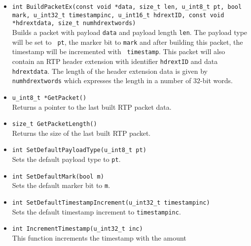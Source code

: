 \documentclass[12pt,a4paper]{article}
\begin{document}
\begin{itemize}
{					                             u\_int16\_t hdrextID, const void *hdrextdata, size\_t numhdrextwords)}\\
						Builds a packet with payload {\tt data} and payload length
						{\tt len}. The payload type, marker and timestamp increment
						used will be those that have been set using the 
						{\tt SetDefault} functions below. This packet will also contain
						an RTP header extension with identifier {\tt hdrextID} and data
						{\tt hdrextdata}. The length of the header extension data
						is given by {\tt numhdrextwords} which expresses the length
						in a number of $32$-bit words.
					\item {\tt int BuildPacketEx(const void *data, size\_t len,
					                             u\_int8\_t pt, bool mark, u\_int32\_t timestampinc,
					                             u\_int16\_t hdrextID, const void *hdrextdata, size\_t numhdrextwords)}\\
						Builds a packet with payload {\tt data} and payload
						length {\tt len}. The payload type will be set to {\tt
						pt}, the marker bit to {\tt mark} and after building
						this packet, the timestamp will be incremented with {\tt
						timestamp}. This packet will also contain an RTP header
						extension with identifier {\tt hdrextID} and data {\tt
						hdrextdata}. The length of the header extension data is
						given by {\tt numhdrextwords} which expresses the length
						in a number of $32$-bit words.
					\item {\tt u\_int8\_t *GetPacket()}\\
						Returns a pointer to the last built RTP packet data.
					\item {\tt size\_t GetPacketLength()}\\
						Returns the size of the last built RTP packet.
					\item {\tt int SetDefaultPayloadType(u\_int8\_t pt)}\\
						Sets the default payload type to {\tt pt}.
					\item {\tt int SetDefaultMark(bool m)}\\
						Sets the default marker bit to {\tt m}.
					\item {\tt int SetDefaultTimestampIncrement(u\_int32\_t timestampinc)}\\
						Sets the default timestamp increment to {\tt timestampinc}.
					\item {\tt int IncrementTimestamp(u\_int32\_t inc)}\\
						This function increments the timestamp with the amount

\end{itemize}
\end{document}
